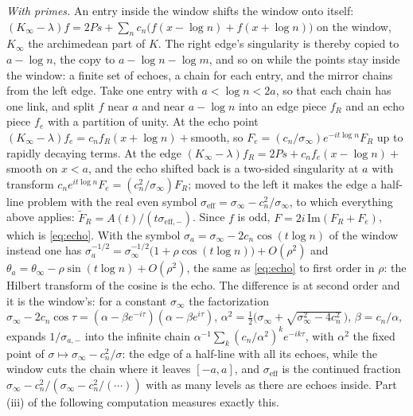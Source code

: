 \documentclass[11pt]{article}
\theoremstyle{definition}
\theoremstyle{remark}
\begin{document}
\emph{With primes.} An entry inside the window shifts the window onto itself: $(K_\infty-\lambda)f=2Ps+\sum_nc_n\big(f(x-\log n)+f(x+\log n)\big)$ on the window, $K_\infty$ the archimedean part of $K$. The right edge's singularity is thereby copied to $a-\log n$, the copy to $a-\log n-\log m$, and so on while the points stay inside the window: a finite set of echoes, a chain for each entry, and the mirror chains from the left edge. Take one entry with $a<\log n<2a$, so that each chain has one link, and split $f$ near $a$ and near $a-\log n$ into an edge piece $f_R$ and an echo piece $f_e$ with a partition of unity. At the echo point $(K_\infty-\lambda)f_e=c_nf_R(x+\log n)+{}$smooth, so $F_e=(c_n/\sigma_\infty)e^{-it\log n}F_R$ up to rapidly decaying terms. At the edge $(K_\infty-\lambda)f_R=2Ps+c_nf_e(x-\log n)+{}$smooth on $x<a$, and the echo shifted back is a two-sided singularity at $a$ with transform $c_ne^{it\log n}F_e=(c_n^2/\sigma_\infty)F_R$; moved to the left it makes the edge a half-line problem with the real even symbol $\sigma_{\mathrm{eff}}=\sigma_\infty-c_n^2/\sigma_\infty$, to which everything above applies: $\tilde F_R=A(t)/(t\sigma_{\mathrm{eff},-})$. Since $f$ is odd, $F=2i\,\mathrm{Im}(F_R+F_e)$, which is \eqref{eq:echo}. With the symbol $\sigma_a=\sigma_\infty-2c_n\cos(t\log n)$ of the window instead one has $\sigma_a^{-1/2}=\sigma_\infty^{-1/2}\big(1+\rho\cos(t\log n)\big)+O(\rho^2)$ and $\theta_a=\theta_\infty-\rho\sin(t\log n)+O(\rho^2)$, the same as \eqref{eq:echo} to first order in $\rho$: the Hilbert transform of the cosine is the echo. The difference is at second order and it is the window's: for a constant $\sigma_\infty$ the factorization $\sigma_\infty-2c_n\cos\tau=(\alpha-\beta e^{-i\tau})(\alpha-\beta e^{i\tau})$, $\alpha^2=\tfrac12\big(\sigma_\infty+\sqrt{\sigma_\infty^2-4c_n^2}\,\big)$, $\beta=c_n/\alpha$, expands $1/\sigma_{a,-}$ into the infinite chain $\alpha^{-1}\sum_k(c_n/\alpha^2)^ke^{-ik\tau}$, with $\alpha^2$ the fixed point of $\sigma\mapsto\sigma_\infty-c_n^2/\sigma$: the edge of a half-line with all its echoes, while the window cuts the chain where it leaves $[-a,a]$, and $\sigma_{\mathrm{eff}}$ is the continued fraction $\sigma_\infty-c_n^2/(\sigma_\infty-c_n^2/(\cdots))$ with as many levels as there are echoes inside. Part (iii) of the following computation measures exactly this.
\end{document}
